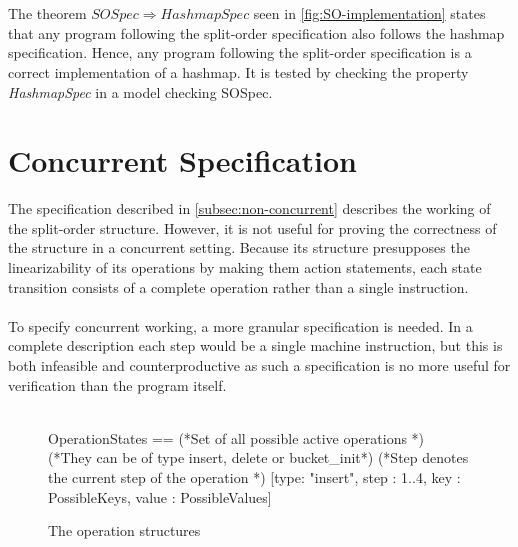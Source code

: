 \documentclass{uit-thesis}
\begin{document}
\\\\
The theorem $SOSpec \Rightarrow HashmapSpec$ seen in \autoref{fig:SO-implementation} states that any program following the split-order specification also follows the hashmap specification. Hence, any program following the split-order specification is a correct implementation of a hashmap. It is tested by checking the property \textit{HashmapSpec} in a model checking SOSpec.

\section{Concurrent Specification}
The specification described in \autoref{subsec:non-concurrent} describes the working of the split-order structure. However, it is not useful for proving the correctness of the structure in a concurrent setting. Because its structure presupposes the linearizability of its operations by making them action statements, each state transition consists of a complete operation rather than a single instruction.
\\\\
To specify concurrent working, a more granular specification is needed. In a complete description each step would be a single machine instruction, but this is both infeasible and counterproductive as such a specification is no more useful for verification than the program itself.
\\\\
\begin{figure}
    \begin{tla}
OperationStates ==
    (*Set of all possible active operations            *)
    (*They can be of type insert, delete or bucket\_init*)
    (*Step denotes the current step of the operation   *)
    [type: {"insert"}, step : 1..4, key : PossibleKeys, value : PossibleValues]
    \end{tla}
\begin{tlatex}
%
%
%
\@xx{}%
%
%
\@xx{}%
%
%
\@xx{}%
%
%
\end{tlatex}
    \caption{The operation structures}
    \label{fig:op-structure}
\end{figure}
\end{document}
